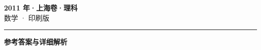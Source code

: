 \documentclass[zihao=5, a4paper]{ctexart}
\begin{document}
\begin{center}
  {\Large\bfseries 2011 年·上海卷·理科}\\[4pt]
  {\large 数学 · 印刷版}
\end{center}
\medskip
{}

\par\bigskip\hrule\bigskip
{}
\begin{center}{\large\bfseries 参考答案与详细解析}\end{center}
\smallskip

\end{document}
